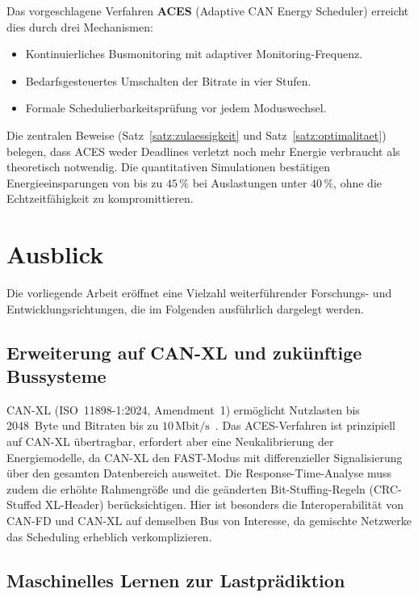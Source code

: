 ﻿\documentclass[a4paper,12pt]{article}
\theoremstyle{definition}
\begin{document}
Das vorgeschlagene Verfahren \textbf{ACES} (Adaptive CAN Energy Scheduler) erreicht
dies durch drei Mechanismen:
\begin{itemize}
    \item Kontinuierliches Busmonitoring mit adaptiver Monitoring-Frequenz.
    \item Bedarfsgesteuertes Umschalten der Bitrate in vier Stufen.
    \item Formale Schedulierbarkeitspr\"{u}fung vor jedem Moduswechsel.
\end{itemize}

Die zentralen Beweise (Satz~\ref{satz:zulaessigkeit} und
Satz~\ref{satz:optimalitaet}) belegen, dass ACES weder Deadlines verletzt
noch mehr Energie verbraucht als theoretisch notwendig.
Die quantitativen Simulationen best\"{a}tigen Energieeinsparungen von bis zu $45\,\%$
bei Auslastungen unter $40\,\%$, ohne die Echtzeitf\"{a}higkeit zu kompromittieren.

\section{Ausblick}

Die vorliegende Arbeit er\"{o}ffnet eine Vielzahl weiterf\"{u}hrender Forschungs- und
Entwicklungsrichtungen, die im Folgenden ausf\"{u}hrlich dargelegt werden.

\subsection{Erweiterung auf CAN-XL und zuk\"{u}nftige Bussysteme}

CAN-XL (ISO~11898-1:2024, Amendment~1) erm\"{o}glicht Nutzlasten bis 2048~Byte
und Bitraten bis zu $10\,\text{Mbit/s}$~\cite{canxl_spec}.
Das ACES-Verfahren ist prinzipiell auf CAN-XL \"{u}bertragbar, erfordert aber
eine Neukalibrierung der Energiemodelle, da CAN-XL den FAST-Modus mit
differenzieller Signalisierung \"{u}ber den gesamten Datenbereich ausweitet.
Die Response-Time-Analyse muss zudem die erh\"{o}hte Rahmengr\"{o}\ss{}e und die
ge\"{a}nderten Bit-Stuffing-Regeln (CRC-Stuffed XL-Header) ber\"{u}cksichtigen.
Hier ist besonders die Interoperabilit\"{a}t von CAN-FD und CAN-XL auf demselben
Bus von Interesse, da gemischte Netzwerke das Scheduling erheblich
verkomplizieren.

\subsection{Maschinelles Lernen zur Lastpr\"{a}diktion}
\end{document}
